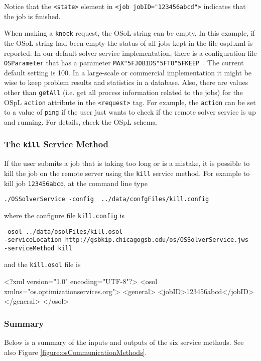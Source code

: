 \documentclass[11pt]{article}
\newcounter{Fig}
\renewcommand{\_}{{\char"5F}}
\renewcommand{\{}{{\char"7B}}
\renewcommand{\}}{{\char"7D}}
\renewcommand{\^}{{\char"0D}}
\renewcommand{\'}{{\char"0D}}
\begin{document}
Notice that the {\tt <state>} element in {\tt <job jobID="123456abcd">} indicates that the job is finished.

When making a {\tt knock} request,  the OSoL string can be empty. In this example, if the OSoL string had been empty the status of all jobs kept in the file ospl.xml is reported.  In our default solver service implementation, there is a configuration file {\tt OSParameter} that has a parameter {\tt MAX\_JOBIDS\_TO\_KEEP }.  The current default setting is 100.  In a large-scale or commercial implementation it might be wise to keep problem results and statistics in a database.  Also, there are values other than {\tt getAll} (i.e. get all process information related to the jobs) for the OSpL {\tt action} attribute in the {\tt <request>} tag.  For example, the {\tt action} can be set to a value of {\tt ping} if the user just wants to check if the remote solver service is up and running. For details, check the OSpL schema.

\subsubsection{The  {\tt kill}   Service Method}

If the user submits a job that is taking too long or is a mistake, it is possible to kill the job on the remote server using the {\tt kill} service method. For example to kill job {\tt 123456abcd}, at the command line type
\begin{verbatim}
./OSSolverService -config  ../data/confgFiles/kill.config
\end{verbatim}
where the configure file {\tt kill.config} is
\begin{verbatim}
-osol ../data/osolFiles/kill.osol
-serviceLocation http://gsbkip.chicagogsb.edu/os/OSSolverService.jws
-serviceMethod kill
\end{verbatim}
and the {\tt kill.osol} file is
\begin{verbatimtab}[4]
<?xml version="1.0" encoding="UTF-8"?>
<osol xmlns="os.optimizationservices.org">
 	<general>
 		<jobID>123456abcd</jobID>
	</general>
</osol>
\end{verbatimtab}


\subsubsection{Summary}

Below is a summary of the inputs and outputs of the six service methods. See also Figure \ref{figure:osCommunicationMethods}.
\end{document}
